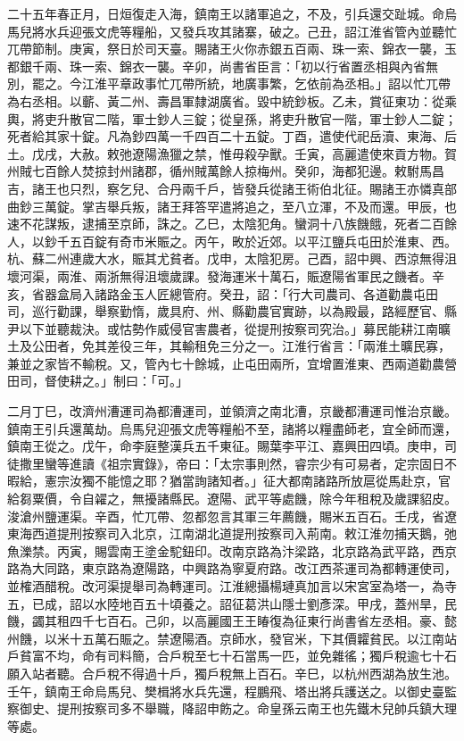 
\begin{pinyinscope}

 二十五年春正月，日烜復走入海，鎮南王以諸軍追之，不及，引兵還交趾城。命烏馬兒將水兵迎張文虎等糧船，又發兵攻其諸寨，破之。己丑，詔江淮省管內並聽忙兀帶節制。庚寅，祭日於司天臺。賜諸王火你赤銀五百兩、珠一索、錦衣一襲，玉都銀千兩、珠一索、錦衣一襲。辛卯，尚書省臣言：「初以行省置丞相與內省無別，罷之。今江淮平章政事忙兀帶所統，地廣事繁，乞依前為丞相。」詔以忙兀帶為右丞相。以蘄、黃二州、壽昌軍隸湖廣省。毀中統鈔板。乙未，賞征東功：從乘輿，將吏升散官二階，軍士鈔人三錠；從皇孫，將吏升散官一階，軍士鈔人二錠；死者給其家十錠。凡為鈔四萬一千四百二十五錠。丁酉，遣使代祀岳瀆、東海、后土。戊戌，大赦。敕弛遼陽漁獵之禁，惟毋殺孕獸。壬寅，高麗遣使來貢方物。賀州賊七百餘人焚掠封州諸郡，循州賊萬餘人掠梅州。癸卯，海都犯邊。敕駙馬昌吉，諸王也只烈，察乞兒、合丹兩千戶，皆發兵從諸王術伯北征。賜諸王亦憐真部曲鈔三萬錠。掌吉舉兵叛，諸王拜答罕遣將追之，至八立渾，不及而還。甲辰，也速不花謀叛，逮捕至京師，誅之。乙巳，太陰犯角。蠻洞十八族饑餓，死者二百餘人，以鈔千五百錠有奇市米賑之。丙午，畋於近郊。以平江鹽兵屯田於淮東、西。杭、蘇二州連歲大水，賑其尤貧者。戊申，太陰犯房。己酉，詔中興、西涼無得沮壞河渠，兩淮、兩浙無得沮壞歲課。發海運米十萬石，賑遼陽省軍民之饑者。辛亥，省器盒局入諸路金玉人匠總管府。癸丑，詔：「行大司農司、各道勸農屯田司，巡行勸課，舉察勤惰，歲具府、州、縣勸農官實跡，以為殿最，路經歷官、縣尹以下並聽裁決。或怙勢作威侵官害農者，從提刑按察司究治。」募民能耕江南曠土及公田者，免其差役三年，其輸租免三分之一。江淮行省言：「兩淮土曠民寡，兼並之家皆不輸稅。又，管內七十餘城，止屯田兩所，宜增置淮東、西兩道勸農營田司，督使耕之。」制曰：「可。」



 二月丁巳，改濟州漕運司為都漕運司，並領濟之南北漕，京畿都漕運司惟治京畿。鎮南王引兵還萬劫。烏馬兒迎張文虎等糧船不至，諸將以糧盡師老，宜全師而還，鎮南王從之。戊午，命李庭整漢兵五千東征。賜葉李平江、嘉興田四頃。庚申，司徒撒里蠻等進讀《祖宗實錄》，帝曰：「太宗事則然，睿宗少有可易者，定宗固日不暇給，憲宗汝獨不能憶之耶？猶當詢諸知者。」征大都南諸路所放扈從馬赴京，官給芻粟價，令自糴之，無擾諸縣民。遼陽、武平等處饑，除今年租稅及歲課貂皮。浚滄州鹽運渠。辛酉，忙兀帶、忽都忽言其軍三年薦饑，賜米五百石。壬戌，省遼東海西道提刑按察司入北京，江南湖北道提刑按察司入荊南。敕江淮勿捕天鵝，弛魚濼禁。丙寅，賜雲南王塗金駝鈕印。改南京路為汴梁路，北京路為武平路，西京路為大同路，東京路為遼陽路，中興路為寧夏府路。改江西茶運司為都轉運使司，並榷酒醋稅。改河渠提舉司為轉運司。江淮總攝楊璉真加言以宋宮室為塔一，為寺五，已成，詔以水陸地百五十頃養之。詔征葛洪山隱士劉彥深。甲戌，蓋州旱，民饑，蠲其租四千七百石。己卯，以高麗國王王睶復為征東行尚書省左丞相。豪、懿州饑，以米十五萬石賑之。禁遼陽酒。京師水，發官米，下其價糶貧民。以江南站戶貧富不均，命有司料簡，合戶稅至七十石當馬一匹，並免雜徭；獨戶稅逾七十石願入站者聽。合戶稅不得過十戶，獨戶稅無上百石。辛巳，以杭州西湖為放生池。壬午，鎮南王命烏馬兒、樊楫將水兵先還，程鵬飛、塔出將兵護送之。以御史臺監察御史、提刑按察司多不舉職，降詔申飭之。命皇孫云南王也先鐵木兒帥兵鎮大理等處。




\end{pinyinscope}
